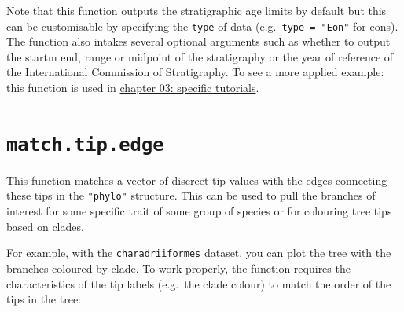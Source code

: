 \documentclass[
]{book}
\newenvironment{Shaded}{\begin{snugshade}}{\end{snugshade}}
\newcommand{\CommentTok}[1]{\textcolor[rgb]{0.56,0.35,0.01}{\textit{#1}}}
\newcommand{\KeywordTok}[1]{\textcolor[rgb]{0.13,0.29,0.53}{\textbf{#1}}}
\newcommand{\NormalTok}[1]{#1}
\newcommand{\OperatorTok}[1]{\textcolor[rgb]{0.81,0.36,0.00}{\textbf{#1}}}
\newcommand{\StringTok}[1]{\textcolor[rgb]{0.31,0.60,0.02}{#1}}
\begin{document}
Note that this function outputs the stratigraphic age limits by default but this can be customisable by specifying the \texttt{type} of data (e.g.~\texttt{type\ =\ "Eon"} for eons).
The function also intakes several optional arguments such as whether to output the startm end, range or midpoint of the stratigraphy or the year of reference of the International Commission of Stratigraphy.
To see a more applied example: this function is used in \protect\hyperlink{chrono-subsets}{chapter 03: specific tutorials}.

\hypertarget{match.tip.edge}{%
\section{\texorpdfstring{\texttt{match.tip.edge}}{match.tip.edge}}\label{match.tip.edge}}

This function matches a vector of discreet tip values with the edges connecting these tips in the \texttt{"phylo"} structure.
This can be used to pull the branches of interest for some specific trait of some group of species or for colouring tree tips based on clades.

For example, with the \texttt{charadriiformes} dataset, you can plot the tree with the branches coloured by clade.
To work properly, the function requires the characteristics of the tip labels (e.g.~the clade colour) to match the order of the tips in the tree:

\begin{Shaded}
\end{Shaded}
\end{document}
